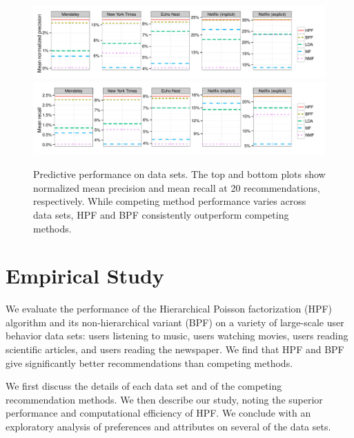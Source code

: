 \begin{figure}[t!]
\centering
\includegraphics[width=\textwidth]{figures/mean_precision_at_20.pdf}\\
\includegraphics[width=\textwidth]{figures/mean_recall_at_20.pdf}\\
\caption{Predictive performance on data sets. The top and bottom plots
  show normalized mean precision and mean recall at 20
  recommendations, respectively. While competing method performance varies
  across data sets, HPF and BPF consistently outperform competing
  methods.}
\label{fig:precision_recall}
\end{figure}


\section{Empirical Study}
\label{sec:eval}
We evaluate the performance of the Hierarchical Poisson factorization
(HPF) algorithm and its non-hierarchical variant (BPF) on a variety of
large-scale user behavior data sets: users listening to music, users
watching movies, users reading scientific articles, and users reading
the newspaper.  We find that HPF and BPF give significantly better
recommendations than competing methods.

We first discuss the details of each data set and of the competing
recommendation methods. We then describe our study, noting the
superior performance and computational efficiency of HPF.  We conclude
with an exploratory analysis of preferences and attributes on several
of the data sets.

